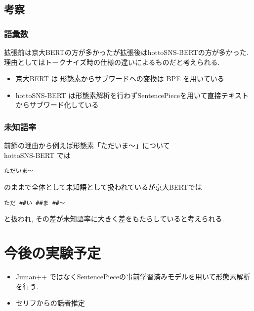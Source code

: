 \documentclass[twocolumn]{jarticle}     %
\begin{document}
\subsection{考察}
\subsubsection{語彙数}
拡張前は京大BERTの方が多かったが拡張後はhottoSNS-BERTの方が多かった.
理由としてはトークナイズ時の仕様の違いによるものだと考えられる.
\begin{itemize}
  \item 京大BERT は 形態素からサブワードへの変換は BPE を用いている
  \item hottoSNS-BERT は形態素解析を行わずSentencePieceを用いて直接テキストからサブワード化している
\end{itemize}
\subsubsection{未知語率}
前節の理由から例えば形態素「ただいま～」について\\
hottoSNS-BERT では
\begin{verbatim}
ただいま～
\end{verbatim}
のままで全体として未知語として扱われているが京大BERTでは
\begin{verbatim}
ただ ##い ##ま ##〜
\end{verbatim}
と扱われ, その差が未知語率に大きく差をもたらしていると考えられる.


\section{今後の実験予定}
\begin{itemize}
  \item Juman++ ではなくSentencePieceの事前学習済みモデルを用いて形態素解析を行う.
  \item セリフからの話者推定
\end{itemize}



\end{document}
